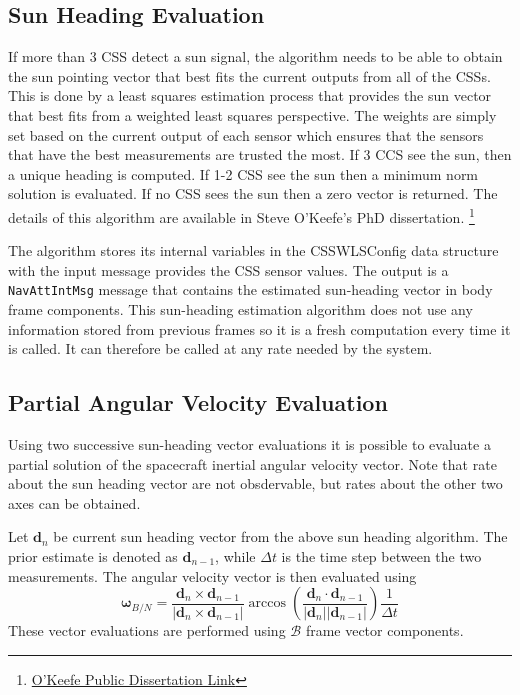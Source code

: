 \documentclass[]{BasiliskReportMemo}
\begin{document}
\subsection{Sun Heading Evaluation}
If more than 3 CSS detect a sun signal, the algorithm needs to be able to obtain 
the sun pointing vector that best fits the current outputs from all of the CSSs.  
This is done by a least squares estimation process that provides the sun vector 
that best fits from a weighted least squares perspective.  The weights are 
simply set based on the current output of each sensor which ensures that the 
sensors that have the best measurements are trusted the most.  If 3 CCS see the sun, then a unique heading is computed.  If 1-2 CSS see the sun then a minimum norm solution is evaluated.  If no CSS sees the sun then a zero vector is returned.
The details of 
this algorithm are available in Steve O'Keefe's PhD dissertation. 
\footnote{\href{http://gradworks.umi.com/3704787.pdf}
   {O'Keefe Public Dissertation Link}}

The algorithm stores its internal variables in the CSSWLSConfig data structure 
with the input message provides the CSS sensor values.  The output is a {\tt NavAttIntMsg} message that contains the estimated sun-heading vector in body frame components.  This 
sun-heading estimation algorithm does not use any information stored from previous frames so it is a 
fresh computation every time it is called.  It can therefore be called at any 
rate needed by the system.


\subsection{Partial Angular Velocity Evaluation}
Using two successive sun-heading vector evaluations it is possible to evaluate a partial solution of the spacecraft inertial angular velocity vector.  Note that rate about the sun heading vector are not obsdervable, but rates about the other two axes can be obtained.  

Let $\bm d_{n}$ be current sun heading vector from the above sun heading algorithm.  The prior estimate is denoted as $\bm d_{n-1}$, while $\Delta t$ is the time step between the two measurements.  The angular velocity vector is then evaluated using
\begin{equation}
	\label{eq:cssEst1}
	\bm\omega_{B/N} = \frac{\bm d_{n} \times \bm d_{n-1}}{|\bm d_{n} \times \bm d_{n-1}|}
	\arccos\left(
		\frac{\bm d_{n} \cdot \bm d_{n-1}}{|\bm d_{n}| |\bm d_{n-1}|} 
	\right) \frac{1}{\Delta t}
\end{equation}
These vector evaluations are performed using $\mathcal{B}$ frame vector components. 
\end{document}
